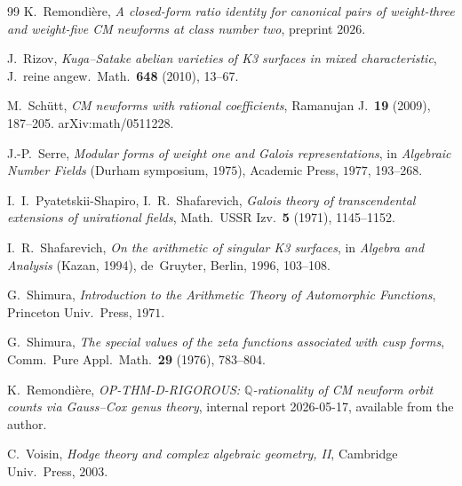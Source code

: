 \documentclass[11pt,a4paper]{amsart}
\theoremstyle{plain}
\theoremstyle{definition}
\newcommand{\Q}{\mathbb{Q}}
\begin{document}
\begin{thebibliography}{99}
K.\ Remondi\`ere,
\emph{A closed-form ratio identity for canonical pairs of weight-three and
weight-five CM newforms at class number two}, preprint $2026$.

J.\ Rizov,
\emph{Kuga--Satake abelian varieties of K3 surfaces in mixed
characteristic}, J.\ reine angew.\ Math.\ \textbf{648} (2010), 13--67.

M.\ Sch\"utt,
\emph{CM newforms with rational coefficients},
Ramanujan J.\ \textbf{19} (2009), 187--205. arXiv:math/0511228.

J.-P.\ Serre,
\emph{Modular forms of weight one and Galois representations}, in
\emph{Algebraic Number Fields} (Durham symposium, $1975$), Academic Press,
$1977$, 193--268.

I.\ I.\ Pyatetskii-Shapiro, I.\ R.\ Shafarevich,
\emph{Galois theory of transcendental extensions of unirational fields},
Math.\ USSR Izv.\ \textbf{5} (1971), 1145--1152.

I.\ R.\ Shafarevich,
\emph{On the arithmetic of singular K3 surfaces},
in \emph{Algebra and Analysis} (Kazan, 1994), de~Gruyter, Berlin,
$1996$, 103--108.

G.\ Shimura,
\emph{Introduction to the Arithmetic Theory of Automorphic Functions},
Princeton Univ.\ Press, $1971$.

G.\ Shimura,
\emph{The special values of the zeta functions associated with cusp
forms}, Comm.\ Pure Appl.\ Math.\ \textbf{29} (1976), 783--804.

K.\ Remondi\`ere,
\emph{OP-THM-D-RIGOROUS: $\Q$-rationality of CM newform orbit counts via
Gauss--Cox genus theory}, internal report 2026-05-17, available from the
author.

C.\ Voisin,
\emph{Hodge theory and complex algebraic geometry, II},
Cambridge Univ.\ Press, $2003$.

\end{thebibliography}
\end{document}
